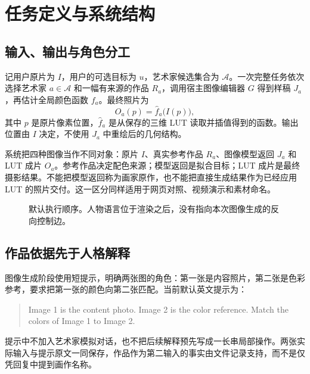 \section{任务定义与系统结构}
\subsection{输入、输出与角色分工}
记用户原片为 $I$，用户的可选目标为 $u$，艺术家候选集合为 $\mathcal{A}$。一次完整任务依次选择艺术家 $a\in\mathcal{A}$ 和一幅有来源的作品 $R_a$，调用宿主图像编辑器 $G$ 得到样稿 $J_a$，再估计全局颜色函数 $f_a$。最终照片为
\begin{equation}
  O_a(p)=\widehat f_a\bigl(I(p)\bigr),
  \label{eq:render}
\end{equation}
其中 $p$ 是原片像素位置，$\widehat f_a$ 是从保存的三维 LUT 读取并插值得到的函数。输出位置由 $I$ 决定，不使用 $J_a$ 中重绘后的几何结构。

系统把四种图像当作不同对象：原片 $I$、真实参考作品 $R_a$、图像模型返回 $J_a$ 和 LUT 成片 $O_a$。参考作品决定配色来源；模型返回是拟合目标；LUT 成片是最终摄影结果。不能把模型返回称为画家原作，也不能把直接生成结果作为已经应用 LUT 的照片交付。这一区分同样适用于网页对照、视频演示和素材命名。

\begin{figure}[t]
\centering
{}
\caption{默认执行顺序。人物语言位于渲染之后，没有指向本次图像生成的反向控制边。}
\label{fig:workflow}
\end{figure}

\subsection{作品依据先于人格解释}
图像生成阶段使用短提示，明确两张图的角色：第一张是内容照片，第二张是色彩参考，要求把第一张的颜色向第二张匹配。当前默认英文提示为：
\begin{quote}
\small Image 1 is the content photo. Image 2 is the color reference. Match the colors of Image 1 to Image 2.
\end{quote}
提示中不加入艺术家模拟对话，也不把后续解释预先写成一长串局部操作。两张实际输入与提示原文一同保存，作品作为第二输入的事实由文件记录支持，而不是仅凭回复中提到画作名称。

